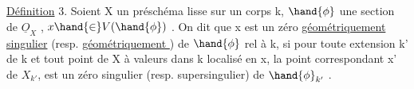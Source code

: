 \uline{Définition} 3. Soient X un préschéma lisse sur un corps k, $\hand{\phi}$ une
section de $\underline{O}_X$ , $x \hand{\in} V(\hand{\phi})$ . On dit que x est un zéro \uline{géométriquement}
\uline{singulier}  (resp. \uline{géométriquement } ) de $\hand{\phi}$ rel à k,
si pour toute extension k' de k et tout point \hand{$\xi$} de X à valeurs dans
k\hand{,} localisé en x, la  point correspondant x' de $X_{k'}$, est un zéro
 singulier (resp. supersingulier) de $\hand{\phi}_{k'}$ .


